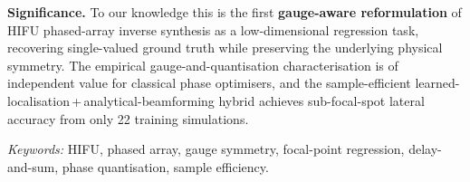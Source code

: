 \documentclass[11pt,a4paper]{article}
\begin{document}
\noindent
\textbf{Significance.}
To our knowledge this is the first \textbf{gauge-aware reformulation} of HIFU
phased-array inverse synthesis as a low-dimensional regression task, recovering
single-valued ground truth while preserving the underlying physical symmetry.
The empirical gauge-and-quantisation characterisation is of independent value
for classical phase optimisers, and the sample-efficient
learned-localisation\,+\,analytical-beamforming hybrid achieves sub-focal-spot
lateral accuracy from only 22 training simulations.

\smallskip\noindent
\textit{Keywords:} HIFU, phased array, gauge symmetry, focal-point regression,
delay-and-sum, phase quantisation, sample efficiency.
\end{document}
